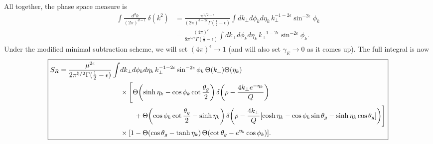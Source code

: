 \documentclass[11pt,twoside,reqno]{amsart}
\theoremstyle{plain}
\theoremstyle{remark}
\theoremstyle{definition}
\theoremstyle{remark}
\theoremstyle{definition}
\theoremstyle{definition}
\begin{document}
	All together, the phase space measure is
	\begin{equation}
	\begin{aligned}
		\int \frac{d^d k}{(2\pi)^{d-1}}\,\delta(k^2) &= \frac{\pi^{1/2-\epsilon}}{(2\pi)^{3-2\epsilon}\Gamma(\frac{1}{2} - \epsilon)}\int dk_\perp d\phi_k d\eta_k \, k_\perp^{-1-2\epsilon} \sin^{-2\epsilon}\phi_k \\
		&= \frac{(4\pi)^\epsilon}{8\pi^{5/2} \Gamma(\frac{1}{2}-\epsilon)} \int dk_\perp d\phi_k d\eta_k\,k_\perp^{-1-2\epsilon} \sin^{-2\epsilon}\phi_k.
	\end{aligned}
	\end{equation}
	Under the modified minimal subtraction scheme, we will set $(4\pi)^\epsilon \to 1$ (and will also set $\gamma_E \to 0$ as it comes up). The full integral is now
	\begin{equation}\label{eq:full integral}
	\boxed{
	\begin{aligned}
		S_R = \frac{\mu^{2\epsilon}}{2\pi^{5/2} \Gamma(\frac{1}{2} - \epsilon)} \int& dk_\perp d\phi_k d\eta_k\, k_\perp^{-1-2\epsilon} \sin^{-2\epsilon}\phi_k \, \Theta(k_\perp)\Theta(\eta_k) \\
		&\times \Bigg[ \Theta\qty(\sinh\eta_k - \cos\phi_k\cot\frac{\theta_g}{2})\,\delta\qty(\rho - \frac{4 k_\perp e^{-\eta_k}}{Q}) \\
			&\qquad+ \Theta\qty(\cos\phi_k\cot\frac{\theta_g}{2} - \sinh\eta_k)\, \delta\qty(\rho - \frac{4 k_\perp}{Q}\qty[\cosh\eta_k - \cos\phi_k\sin\theta_g - \sinh\eta_k\cos\theta_g])\Bigg] \\
			&\times \qty[1 - \Theta(\cos\theta_g - \tanh\eta_k)\,\Theta\qty(\cot\theta_g - e^{\eta_k}\cos\phi_k)].
	\end{aligned}
	}
	\end{equation}
\end{document}
